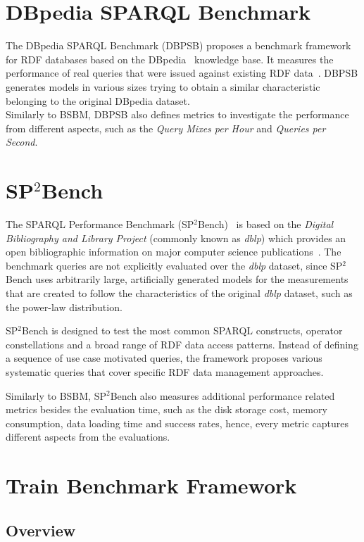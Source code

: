 \section{DBpedia SPARQL Benchmark}
The DBpedia SPARQL Benchmark (DBPSB) proposes a benchmark framework for RDF databases based on the DBpedia~\cite{dbpedia_data} knowledge base. It measures the performance of real queries that were issued against existing RDF data~\cite{dbpedia}. DBPSB generates models in various sizes trying to obtain a similar characteristic belonging to the original DBpedia dataset.\\
Similarly to BSBM, DBPSB also defines metrics to investigate the performance from different aspects, such as the \textit{Query Mixes per Hour} and \textit{Queries per Second}. 

\section{SP$^2$Bench}

The SPARQL Performance Benchmark (SP$^2$Bench)~\cite{sp2bench} is based on the \textit{Digital Bibliography and Library Project} (commonly known as \textit{dblp}) which provides an open bibliographic information on major computer science publications~\cite{dblp}. The benchmark queries are not explicitly evaluated over the \textit{dblp} dataset, since SP$^2$Bench uses arbitrarily large, artificially generated models for the measurements that are created to follow the characteristics of the original \textit{dblp} dataset, such as the power-law distribution.

SP$^2$Bench is designed to test the most common SPARQL constructs, operator constellations and a broad range of RDF data access patterns. Instead of defining a sequence of use case motivated queries, the framework proposes various systematic queries that cover specific RDF data management approaches.

Similarly to BSBM, SP$^2$Bench also measures additional performance related metrics besides the evaluation time, such as the disk storage cost, memory consumption, data loading time and success rates, hence, every metric captures different aspects from the evaluations.

\section{Train Benchmark Framework}\label{sec:train}

\subsection{Overview}

